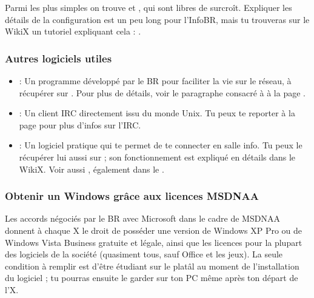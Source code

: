 Parmi les plus simples on trouve  et , qui sont libres de surcro\^{i}t. Expliquer les détails de la configuration est un peu long pour l'InfoBR, mais tu trouveras sur le WikiX un tutoriel expliquant cela : .

\subsubsection{Autres logiciels utiles}

\begin{itemize}
  \item {} : Un programme développé par le BR pour faciliter la vie sur le réseau,
                  à récupérer sur \xshare. Pour plus de détails, voir le paragraphe consacré
                  à  à la page \pageref{qrezix}.
  \item {} : Un client IRC directement issu du monde Unix.
                 Tu peux te reporter à la page \pageref{irc} pour plus d'infos sur l'IRC.
  \item {} : Un logiciel pratique qui te permet de te connecter en salle info.
                  Tu peux le récupérer lui aussi sur \xshare ;
                  son fonctionnement est expliqué en détails dans le WikiX. Voir aussi , également dans le \xshare.
\end{itemize}


\subsubsection{Obtenir un Windows grâce aux licences MSDNAA}

\label{msdnaa} Les accords négociés par le BR avec Microsoft dans le cadre de MSDNAA donnent à chaque X le droit de posséder une version de Windows
XP Pro ou de Windows Vista Business gratuite et légale, ainsi que les licences pour la plupart des logiciels de la société (quasiment tous, sauf
Office et les jeux). La seule condition à remplir est d'être étudiant sur le platâl au moment de l'installation du logiciel ; tu pourras ensuite le
garder sur ton PC même après ton départ de l'X.


